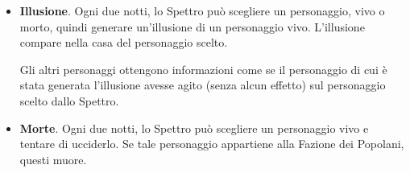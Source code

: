 \documentclass[a4paper,10pt]{article}
\begin{document}
\begin{itemize}

	\item {\bf Illusione}. Ogni due notti, lo Spettro può scegliere un personaggio, vivo o morto, quindi generare un'illusione di un personaggio vivo. L'illusione compare nella casa del personaggio scelto.
 
	Gli altri personaggi ottengono informazioni come se il personaggio di cui è stata generata l'illusione avesse agito (senza alcun effetto) sul personaggio scelto dallo Spettro.
 
 

 
	\item {\bf Morte}. Ogni due notti, lo Spettro può scegliere un personaggio vivo e tentare di ucciderlo. Se tale personaggio appartiene alla Fazione dei Popolani, questi muore. 
 

\end{itemize}
\end{document}
